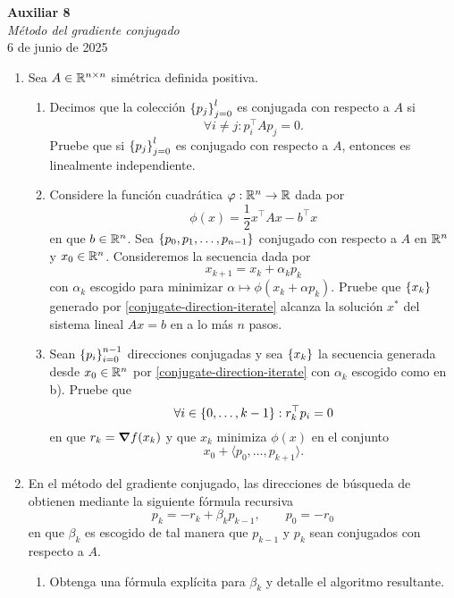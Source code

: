 \documentclass{article}
\begin{document}


\begin{center}
	\Huge{\textbf{Auxiliar 8}}\\
	\textit{\large{Método del gradiente conjugado}}\\
	\normalsize
	6 de junio de 2025
\end{center}

\begin{enumerate}
	\item Sea \(A \in \mathbb{R}^{n \times n}\) simétrica definida positiva.
	\begin{enumerate}
		\item Decimos que la colección \(\qty{p_j}_{j=0}^l\) es conjugada con respecto a \(A\) si
		\[\forall i \neq j : p_i^\top A p_j = 0.\]
		Pruebe que si \(\qty{p_j}_{j=0}^l\) es conjugado con respecto a \(A\), entonces es linealmente independiente.
		\item Considere la función cuadrática \(\varphi: \mathbb{R}^n \to \mathbb{R}\) dada por
		\[\phi(x) = \frac{1}{2} x^\top A x - b^\top x\]
		en que \(b \in \mathbb{R}^n\). Sea \(\qty{p_0, p_1, \dots,p_{n-1}}\) conjugado con respecto a \(A\) en \(\mathbb{R}^n\) y \(x_0 \in \mathbb{R}^n\). Consideremos la secuencia dada por
		\begin{equation} \label{conjugate-direction-iterate}
			x_{k+1} = x_k + \alpha_k p_k
		\end{equation}
		con \(\alpha_k\) escogido para minimizar \(\alpha \mapsto \phi(x_k + \alpha p_k)\). Pruebe que \(\qty{x_k}\) generado por \ref{conjugate-direction-iterate} alcanza la solución \(x^*\) del sistema lineal \(Ax = b\) en a lo más \(n\) pasos.
		\item Sean \(\qty{p_i}_{i=0}^{n-1}\) direcciones conjugadas y sea \(\qty{x_k}\) la secuencia generada desde \(x_0 \in \mathbb{R}^n\) por \ref{conjugate-direction-iterate} con \(\alpha_k\) escogido como en b). Pruebe que
		\[\forall i \in \qty{0, \dots, k-1} : r_k^\top p_i = 0\]
		en que \(r_k = \grad f (x_k)\) y que \(x_k\) minimiza \(\phi(x)\) en el conjunto
		\[x_0 + \langle p_0, \dots, p_{k+1} \rangle.\]
	\end{enumerate}
	\item En el método del gradiente conjugado, las direcciones de búsqueda de obtienen mediante la siguiente fórmula recursiva
	\[p_k = -r_k + \beta_k p_{k-1}, \qquad p_0 = -r_0\]
	en que \(\beta_k\) es escogido de tal manera que \(p_{k-1}\) y \(p_k\) sean conjugados con respecto a \(A\).
	\begin{enumerate}
		\item Obtenga una fórmula explícita para \(\beta_k\) y detalle el algoritmo resultante.

\end{enumerate}
\end{enumerate}
\end{document}
